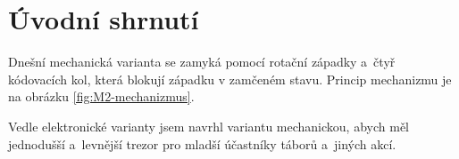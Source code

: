 \section{Úvodní shrnutí}

Dnešní mechanická varianta se zamyká pomocí rotační západky a~čtyř kódovacích kol, která blokují západku v zamčeném stavu. 
Princip mechanizmu je na obrázku \ref{fig:M2-mechanizmus}.

Vedle elektronické varianty jsem navrhl variantu mechanickou, abych měl jednodušší a~levnější trezor pro mladší účastníky táborů a~jiných akcí. 
